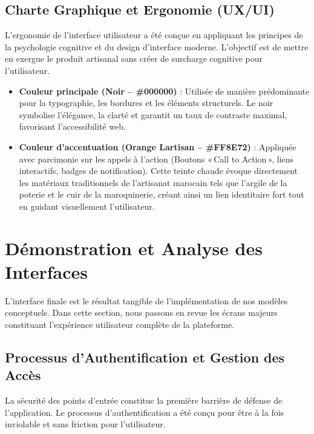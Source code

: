 \subsection{Charte Graphique et Ergonomie (UX/UI)}
L'ergonomie de l'interface utilisateur a été conçue en appliquant les principes de la psychologie cognitive et du design d'interface moderne. L'objectif est de mettre en exergue le produit artisanal sans créer de surcharge cognitive pour l'utilisateur. 

\begin{itemize}
    \item \textbf{Couleur principale (Noir -- \#000000)} : Utilisée de manière prédominante pour la typographie, les bordures et les éléments structurels. Le noir symbolise l'élégance, la clarté et garantit un taux de contraste maximal, favorisant l'accessibilité web.
    \item \textbf{Couleur d'accentuation (Orange Lartisan -- \#FF8E72)} : Appliquée avec parcimonie sur les appels à l'action (Boutons «\,Call to Action\,», liens interactifs, badges de notification). Cette teinte chaude évoque directement les matériaux traditionnels de l'artisanat marocain tels que l'argile de la poterie et le cuir de la maroquinerie, créant ainsi un lien identitaire fort tout en guidant visuellement l'utilisateur.
\end{itemize}

\section{Démonstration et Analyse des Interfaces}
L'interface finale est le résultat tangible de l'implémentation de nos modèles conceptuels. Dans cette section, nous passons en revue les écrans majeurs constituant l'expérience utilisateur complète de la plateforme.

\subsection{Processus d'Authentification et Gestion des Accès}
La sécurité des points d'entrée constitue la première barrière de défense de l'application. Le processus d'authentification a été conçu pour être à la fois inviolable et sans friction pour l'utilisateur.


